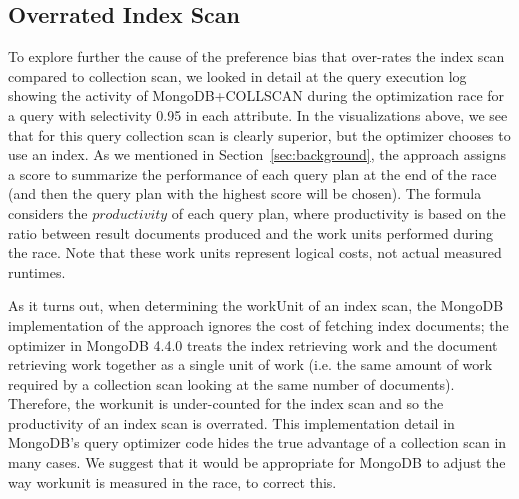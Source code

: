 \vspace*{-0.5\baselineskip}
\subsection{Overrated Index Scan}
To explore further the cause of the preference bias that over-rates the index scan compared to collection scan, we looked in detail at the query execution log showing the activity of MongoDB+COLLSCAN during the optimization race for a query with selectivity 0.95 in each attribute. In the visualizations above, we see that for this query collection scan is clearly superior, but the optimizer chooses to use an index. As we mentioned in Section~\ref{sec:background}, the \approachName approach assigns a score to summarize the performance of each query plan at the end of the race (and then the query plan with the highest score will be chosen). The formula considers the $productivity$ of each query plan, where productivity is based on the ratio between result documents produced and the work units performed during the race. Note that these work units represent logical costs, not actual measured runtimes.

As it turns out, when determining the workUnit of an index scan, the MongoDB implementation of the \approachName approach ignores the cost of fetching index documents; the optimizer in MongoDB 4.4.0 treats the index retrieving work and the document retrieving work together as a single unit of work (i.e. the same amount of work required by a collection scan looking at the same number of documents). Therefore, the workunit is under-counted for the index scan and so the productivity of an index scan is overrated. This implementation detail in MongoDB's query optimizer code hides the true advantage of a collection scan in many cases.  We suggest that it would be appropriate for MongoDB to adjust the way workunit is measured in the race, to correct this.

